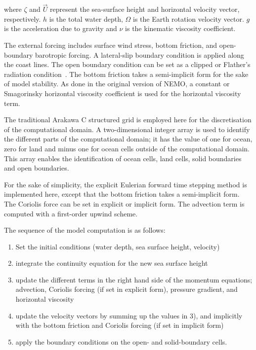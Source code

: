 \documentclass[gmdd, manuscript]{copernicus}
\begin{document}
where $\zeta$ and $\vec{U}$ represent the sea-surface height and
horizontal velocity vector, respectively. $h$ is the total water
depth, $\Omega$ is the Earth rotation velocity vector.  $g$ is the
acceleration due to gravity and $\nu$ is the kinematic viscosity coefficient.

The external forcing includes surface wind stress, bottom friction,
and open-boundary barotropic forcing. A lateral-slip boundary
condition is applied along the coast lines. The open boundary
condition can be set as a clipped or Flather's radiation
condition~\citep{flather76}. The bottom friction takes a semi-implicit
form for the sake of model stability. As done in the original version
of NEMO, a constant or Smagorinsky horizontal viscosity coefficient is
used for the horizontal viscosity term.

The traditional Arakawa C structured grid is employed here for the
discretisation of the computational domain. A two-dimensional integer
array is used to identify the different parts of the computational
domain; it has the value of one for ocean, zero for land and minus
one for ocean cells outside of the computational domain. This array
enables the identification of ocean cells, land cells, solid boundaries
and open boundaries.

For the sake of simplicity, the explicit Eulerian forward time
stepping method is implemented here, except that the bottom friction
takes a semi-implicit form.  The Coriolis force can be set in explicit
or implicit form. The advection term is computed with a first-order
upwind scheme.

The sequence of the model computation is as follows:
\begin{enumerate}
\item Set the initial conditions (water depth, sea surface height, velocity)
\item integrate the continuity equation for the new sea surface height
\item update the different terms in the right hand side of the momentum equations; advection, Coriolis forcing (if set in explicit form), pressure gradient, and horizontal viscosity
\item update the velocity vectors by summing up the values in 3), and implicitly with the bottom friction and Coriolis forcing (if set in implicit form)
\item apply the boundary conditions on the open- and solid-boundary cells.
\end{enumerate}
\end{document}

